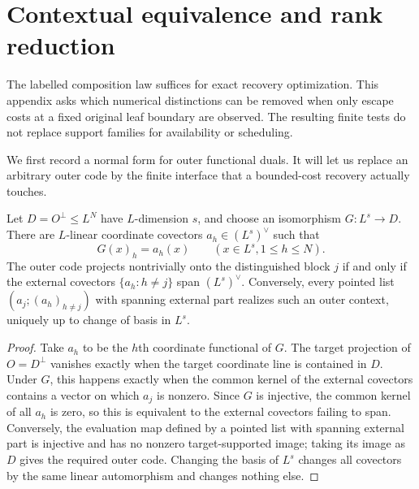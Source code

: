 \section{Contextual equivalence and rank reduction}
\label{sec:contextual-refinement}

The labelled composition law suffices for exact recovery optimization.
This appendix asks which numerical distinctions can be removed when only
escape costs at a fixed original leaf boundary are observed.  The resulting
finite tests do not replace support families for availability or scheduling.

We first record a normal form for outer functional duals.  It will let us
replace an arbitrary outer code by the finite interface that a bounded-cost
recovery actually touches.

\begin{lemma}
\label{lem:outer-column-types}
%
Let $D=O^\perp\leq L^N$ have $L$-dimension $s$, and choose an isomorphism
$G:L^s\to D$.  There are $L$-linear coordinate covectors
$a_h\in(L^s)^\vee$ such that
\[
 G(x)_h=a_h(x)\qquad(x\in L^s, 1\leq h\leq N).
\]
The outer code projects nontrivially onto the distinguished block $j$ if and
only if the external covectors $\{a_h:h\ne j\}$ span $(L^s)^\vee$.
Conversely, every pointed list $(a_j;(a_h)_{h\ne j})$ with spanning external
part realizes such an outer context, uniquely up to change of basis in $L^s$.
\end{lemma}

\begin{proof}
Take $a_h$ to be the $h$th coordinate functional of $G$.  The target
projection of $O=D^\perp$ vanishes exactly when the target coordinate line is
contained in $D$.  Under $G$, this happens exactly when the common kernel of
the external covectors contains a vector on which $a_j$ is nonzero.  Since
$G$ is injective, the common kernel of all $a_h$ is zero, so this is equivalent
to the external covectors failing to span.  Conversely, the evaluation map
defined by a pointed list with spanning external part is injective and has no
nonzero target-supported image; taking its image as $D$ gives the required
outer code.  Changing the basis of $L^s$ changes all covectors by the same
linear automorphism and changes nothing else.
%
\end{proof}

